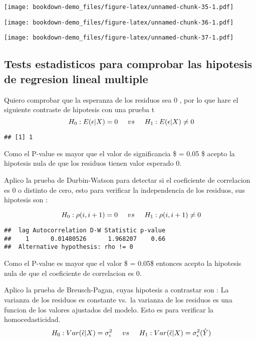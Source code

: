 \documentclass[]{book}
\begin{document}
\texttt{[image: bookdown-demo\_files/figure-latex/unnamed-chunk-35-1.pdf]}

\texttt{[image: bookdown-demo\_files/figure-latex/unnamed-chunk-36-1.pdf]}

\texttt{[image: bookdown-demo\_files/figure-latex/unnamed-chunk-37-1.pdf]}

\subsection{Tests estadisticos para comprobar las hipotesis de regresion
lineal
multiple}\label{tests-estadisticos-para-comprobar-las-hipotesis-de-regresion-lineal-multiple}

Quiero comprobar que la esperanza de los residuos sea 0 , por lo que
hare el siguiente contraste de hipotesis con una prueba t
\[ \ H_{0} : E(\epsilon|X) = 0 \hspace{0.5cm} vs \hspace{0.5cm} H_{1}: E(\epsilon|X) \neq 0 \]

\begin{verbatim}
## [1] 1
\end{verbatim}

Como el P-value es mayor que el valor de significancia \$ \alpha = 0.05
\$ acepto la hipotesis nula de que los residuos tienen valor esperado 0.

Aplico la prueba de Durbin-Watson para detectar si el coeficiente de
correlacion es 0 o distinto de cero, esto para verificar la
independencia de los residuos, sus hipotesis son :

\[ \ H_{0} : \rho(i,i+1) = 0 \hspace{0.5cm} vs \hspace{0.5cm} H_{1}: \rho(i,i+1) \neq 0 \]

\begin{verbatim}
##  lag Autocorrelation D-W Statistic p-value
##    1      0.01480526      1.968207    0.66
##  Alternative hypothesis: rho != 0
\end{verbatim}

Como el P-value es mayor que el valor \$ \alpha = 0.05\$ entonces acepto
la hipotesis nula de que el coeficiente de correlacion es 0.

Aplico la prueba de Breusch-Pagan, cuyas hipotesis a contrastar son : La
varianza de los residuos es constante vs.~la varianza de los residuos es
una funcion de los valores ajustados del modelo. Esto es para verificar
la homocedasticidad.
\[ \ H_{0}: Var(\hat{\epsilon} |X) = \sigma_{\epsilon}^{2} \hspace{0.5cm} vs \hspace{0.5cm} H_{1}: Var(\hat{\epsilon} |X) =  \sigma_{\epsilon}^{2}( \hat{Y}) \]
\end{document}
